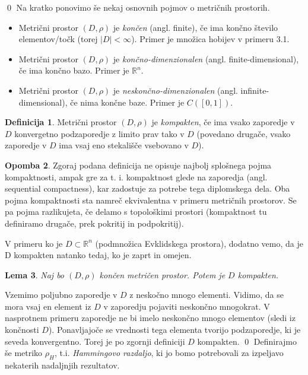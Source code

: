 \documentclass[12pt,a4paper]{amsart}
\theoremstyle{definition} %
\newtheorem{definicija}{Definicija}[section]
\newtheorem{opomba}[definicija]{Opomba}
\theoremstyle{plain} %
\newtheorem{lema}[definicija]{Lema}
\begin{document}
\qed
\newline
\newline
Na kratko ponovimo še nekaj osnovnih pojmov o metričnih prostorih.
\begin{itemize}
\item Metrični prostor $(D, \rho)$ je \textit{končen} (angl. finite), če ima končno število elementov/točk (torej $|D| < \infty$). Primer je množica hobijev v primeru 3.1.
\item Metrični prostor $(D, \rho)$ je \textit{končno-dimenzionalen} (angl. finite-dimensional), če ima končno bazo. Primer je $\mathbb{R}^n$.
\item Metrični prostor $(D, \rho)$ je \textit{neskončno-dimenzionalen} (angl. infinite-dimensional), če nima končne baze. Primer je $C([0,1])$.
\end{itemize}
\begin{definicija}
Metrični prostor $(D, \rho)$ je \textit{kompakten}, če ima vsako zaporedje v $D$ konvergetno podzaporedje z limito prav tako v $D$ (povedano drugače, vsako zaporedje v $D$ ima vsaj eno stekališče vsebovano v $D$).
\end{definicija}
\begin{opomba}
Zgoraj podana definicija ne opisuje najbolj splošnega pojma kompaktnosti, ampak gre za  t. i. kompaktnost glede na zaporedja (angl. sequential compactness), kar zadostuje za potrebe tega diplomskega dela. Oba pojma kompaktnosti sta namreč ekvivalentna v primeru metričnih prostorov. Se pa pojma razlikujeta, če delamo s topološkimi prostori (kompaktnost tu definiramo drugače, prek pokritij in podpokritij).
\end{opomba}
V primeru ko je $D \subset \mathbb{R}^n$ (podmnožica Evklidskega prostora), dodatno vemo, da je D kompakten natanko tedaj, ko je zaprt in omejen.
\begin{lema}
Naj bo $(D, \rho)$ končen metričen prostor. Potem je $D$ kompakten.
\end{lema}
\proof
Vzemimo poljubno zaporedje v $D$ z neskočno mnogo elementi. Vidimo, da se mora vsaj en element iz $D$ v zaporedju pojaviti neskončno mnogokrat. V nasprotnem primeru zaporedje ne bi imelo neskončno mnogo elementov (sledi iz končnosti $D$). Ponavljajoče se vrednosti tega elementa tvorijo podzaporedje, ki je seveda konvergentno. Torej je po zgornji definiciji $D$ kompakten.
\qed
\newline
\newline
Definirajmo še metriko $\rho_H$, t.i. \textit{Hammingovo razdaljo}, ki jo bomo potrebovali za izpeljavo nekaterih nadaljnjih rezultatov. 
\end{document}
